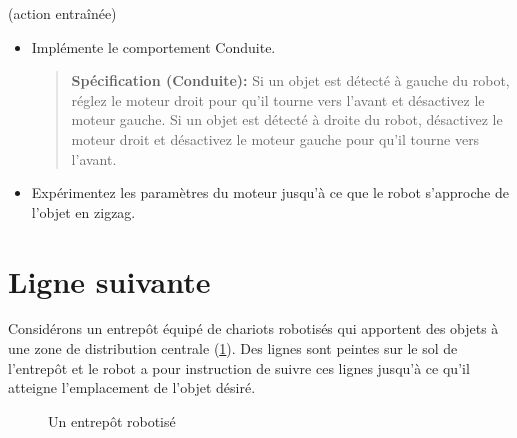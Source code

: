 \begin{framed}
 (action entraînée)
\begin{itemize}
\item Implémente le comportement Conduite.
\begin{quote}
\normalsize\noindent\textbf{Spécification (Conduite):} Si un objet est détecté à gauche du robot, réglez le moteur droit pour qu'il tourne vers l'avant et désactivez le moteur gauche. Si un objet est détecté à droite du robot, désactivez le moteur droit et désactivez le moteur gauche pour qu'il tourne vers l'avant.
\end{quote}
\item Expérimentez les paramètres du moteur jusqu'à ce que le robot s'approche de l'objet en zigzag.
\end{itemize}
\end{framed}


\section{Ligne suivante}\label{s.line}

Considérons un entrepôt équipé de chariots robotisés qui apportent des objets à une zone de distribution centrale (\ref{fig.warehouse}). Des lignes sont peintes sur le sol de l'entrepôt et le robot a pour instruction de suivre ces lignes jusqu'à ce qu'il atteigne l'emplacement de l'objet désiré.

\begin{figure}
\begin{center}
\caption{Un entrepôt robotisé}\label{fig.warehouse}
\end{center}
\end{figure}

